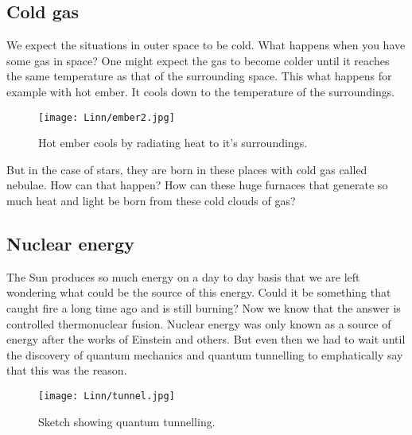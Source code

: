 \documentclass{../template/texnote}
\begin{document}
\subsection{Cold gas}
We expect the situations in outer space to be cold. 
What happens when  you have some gas in space?
One might expect the gas to become colder until it reaches the same temperature as that of the surrounding space.
This what happens for example with hot ember. It cools down to the temperature of the surroundings.
    \begin{figure}
    \begin{center}
	\texttt{[image: Linn/ember2.jpg]}
    \end{center}
    \caption{Hot ember cools by radiating heat to it's surroundings.}
    \label{fig:ember}
    \end{figure}
    
But in the case of stars, they are born in these places with cold gas called nebulae.
How can that happen? How can these huge furnaces that generate so much heat and light be born from these cold clouds of gas?

\subsection{Nuclear energy}
The Sun produces so much energy on a day to day basis that we are left wondering what could be the source of this energy.
Could it be something that caught fire a long time ago and is still burning?
Now we know that the answer is controlled thermonuclear fusion.
Nuclear energy was only known as a source of energy after the works of Einstein and others.
But even then we had to wait until the discovery of quantum mechanics and quantum tunnelling to emphatically say that this was the reason.
    \begin{figure}
    \begin{center}
	\texttt{[image: Linn/tunnel.jpg]}
    \end{center}
    \caption{Sketch showing quantum tunnelling.}
    \label{fig:}
    \end{figure}
    
\end{document}

